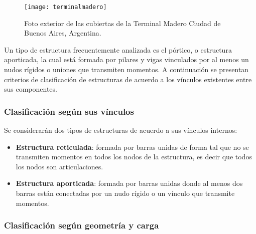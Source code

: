 \begin{figure}[htb]
	\centering
	\texttt{[image: terminalmadero]}
  \caption{Foto exterior de las cubiertas de la Terminal Madero Ciudad de Buenos Aires, Argentina.}
\label{fig:termmadero}
\end{figure}

Un tipo de estructura frecuentemente analizada es el pórtico, o estructura aporticada, la cual está formada por pilares y vigas vinculados por al menos un nudos rígidos o uniones que transmiten momentos. %
%
A continuación se presentan criterios de clasificación de estructuras de acuerdo a los vínculos existentes entre sus componentes.




\subsubsection{Clasificación según sus vínculos}

Se considerarán dos tipos de estructuras de acuerdo a sus vínculos internos:
%
\begin{itemize}
\item \textbf{Estructura reticulada}: formada por barras unidas de forma tal que no se transmiten momentos en todos los nodos de la estructura, es decir que todos los nodos son articulaciones.
%
\item \textbf{Estructura aporticada}: formada por barras unidas donde al menos dos barras están conectadas por un nudo rígido o un vínculo que transmite momentos.
\end{itemize}




\subsubsection{Clasificación según geometría y carga} \label{sec:clasifest}

